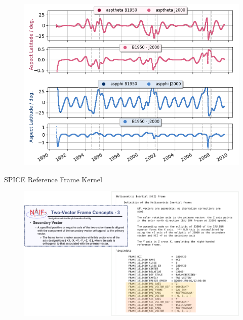 \documentclass{beamer}
\begin{document}
\begin{frame}{}
\begin{figure}
	\includegraphics[scale=0.7]{Pics/aa_vergleich_all.png}
\end{figure}
\end{frame}

\begin{frame}{SPICE Reference Frame Kernel}
\flushleft
\begin{figure}								
	\includegraphics[width=1.1\textwidth]{Pics/kernel_instruction.png}
\end{figure}
\end{frame}




\begin{frame}{}

\end{frame}


%
%
\end{document}
